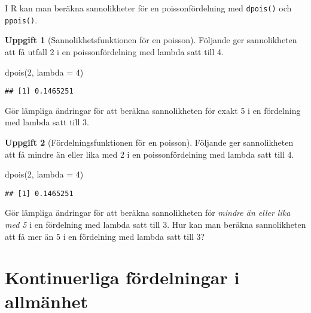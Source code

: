 \documentclass[
]{book}
\newenvironment{Shaded}{\begin{snugshade}}{\end{snugshade}}
\newcommand{\AttributeTok}[1]{\textcolor[rgb]{0.77,0.63,0.00}{#1}}
\newcommand{\DecValTok}[1]{\textcolor[rgb]{0.00,0.00,0.81}{#1}}
\newcommand{\FunctionTok}[1]{\textcolor[rgb]{0.00,0.00,0.00}{#1}}
\newcommand{\NormalTok}[1]{#1}
\theoremstyle{definition}
\theoremstyle{definition}
\theoremstyle{definition}
\newtheorem{exercise}{Uppgift}[chapter]
\theoremstyle{definition}
\theoremstyle{remark}
\begin{document}
I R kan man beräkna sannolikheter för en poissonfördelning med \texttt{dpois()} och \texttt{ppois()}.

\begin{exercise}[Sannolikhetsfunktionen för en poisson]
Följande ger sannolikheten att få utfall 2 i en poissonfördelning med lambda satt till 4.

\begin{Shaded}
\begin{Highlighting}[]
\FunctionTok{dpois}\NormalTok{(}\DecValTok{2}\NormalTok{, }\AttributeTok{lambda =} \DecValTok{4}\NormalTok{)}
\end{Highlighting}
\end{Shaded}

\begin{verbatim}
## [1] 0.1465251
\end{verbatim}

Gör lämpliga ändringar för att beräkna sannolikheten för exakt 5 i en fördelning med lambda satt till 3.
\end{exercise}

\begin{exercise}[Fördelningsfunktionen för en poisson]
Följande ger sannolikheten att få mindre än eller lika med 2 i en poissonfördelning med lambda satt till 4.

\begin{Shaded}
\begin{Highlighting}[]
\FunctionTok{dpois}\NormalTok{(}\DecValTok{2}\NormalTok{, }\AttributeTok{lambda =} \DecValTok{4}\NormalTok{)}
\end{Highlighting}
\end{Shaded}

\begin{verbatim}
## [1] 0.1465251
\end{verbatim}

Gör lämpliga ändringar för att beräkna sannolikheten för \emph{mindre än eller lika med 5} i en fördelning med lambda satt till 3.
Hur kan man beräkna sannolikheten att få mer än 5 i en fördelning med lambda satt till 3?
\end{exercise}

\hypertarget{kontinuerliga-fuxf6rdelningar-i-allmuxe4nhet}{%
\section{Kontinuerliga fördelningar i allmänhet}\label{kontinuerliga-fuxf6rdelningar-i-allmuxe4nhet}}
\end{document}
